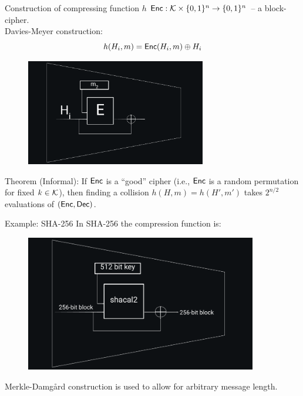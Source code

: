 \documentclass[usenames,dvipsnames, 9pt]{beamer}
\begin{document}
\begin{frame}{Construction of compressing function $h$}
\Large
	$\textsf{Enc}: \mathcal{K} \times \{0,1\}^n \rightarrow  \{0,1\}^n$ -- a block-cipher.  \\{\color{Orange} Davies-Meyer construction:}
	\[
	h(H_{i}, m) = \textsf{Enc}(H_i, m)\oplus H_i
	\]
	\begin{figure}
		\includegraphics[width=0.7\textwidth]{DaviesMeyerCompression}
	\end{figure}

	{\color{Orange} Theorem (Informal):}  If $\textsf{Enc}$ is a ``good'' cipher (i.e., $\textsf{Enc}$ is a random permutation for fixed $k \in \mathcal{K}$),  then finding a collision $h(H, m) = h(H', m')$ takes $2^{n/2}$ evaluations of $(\textsf{Enc}, \textsf{Dec})$.
	
\end{frame}

\begin{frame}{Example: SHA-256}
\Large 
In SHA-256 the compression function is:
	\begin{figure}
		\includegraphics[width=0.9\textwidth]{SHA256}
	\end{figure}

 Merkle-Damg\aa rd construction is used to allow for arbitrary message length.

\end{frame}
\end{document}
